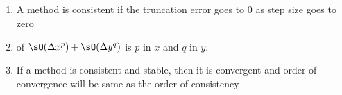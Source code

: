 \documentclass[11pt]{article}
\begin{document}
\subsection{}


\begin{enumerate}
    \item {} A method is consistent if the truncation error goes to 0 as step size goes to zero
    \item {} of $\sO(\Dx^p)+\sO(\Dy^q)$ is $p$ in $x$ and $q$ in $y$.
    \item {} If a method is consistent and stable, then it is convergent and order of convergence will be same as the order of consistency
\end{enumerate}
\end{document}
